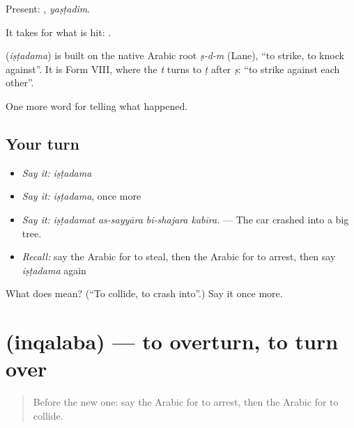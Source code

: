 Present: , \emph{yaṣṭadim}.

It takes  for what is hit:  .

\begin{cousinweb}
\textbf{} (\emph{iṣṭadama}) is built on the native Arabic root \emph{ṣ-d-m} (Lane), \textquotedblleft{}to strike, to knock against\textquotedblright{}. It is Form VIII, where the \emph{t} turns to \emph{ṭ} after \emph{ṣ}: \textquotedblleft{}to strike against each other\textquotedblright{}.
\end{cousinweb}

\begin{grammarlens}[title={What you've built}]
One more word for telling what happened.
\end{grammarlens}

\subsection*{Your turn}
\begin{itemize}
\raggedright
  \item \emph{Say it:} \emph{iṣṭadama}
  \item \emph{Say it:} \emph{iṣṭadama}, once more
  \item \emph{Say it:} \emph{iṣṭadamat as-sayyāra bi-shajara kabīra.} — The car crashed into a big tree.
  \item \emph{Recall:} say the Arabic for to steal, then the Arabic for to arrest, then say \emph{iṣṭadama} again
\end{itemize}

\begin{tcolorbox}[breakable,colback=teal!4,colframe=teal!35!black,title={Before you move on}]
What does  mean? (\textquotedblleft{}To collide, to crash into\textquotedblright{}.) Say it once more.
\end{tcolorbox}
\section[\texorpdfstring{\ar{انقلب} (inqalaba)}{انقلب (inqalaba)}]{ (inqalaba) — to overturn, to turn over}

\label{lesson:AR-C301-inqalaba}



\begin{quote}
Before the new one: say the Arabic for to arrest, then the Arabic for to collide.
\end{quote}

